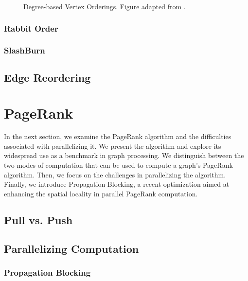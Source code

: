 \begin{figure}[!htb]
    \begin{adjustwidth}{-0.75in}{-0.75in}
        \centering
        
        \caption{
            Degree-based Vertex Orderings. Figure adapted from \cite{lwr}.
        }
        \label{fig:degree_based_vertex_orderings}   %
    \end{adjustwidth}
\end{figure}


\subsubsection{Rabbit Order}
\subsubsection{SlashBurn}
\subsection{Edge Reordering}

\section{PageRank}

In the next section, we examine the PageRank algorithm and the difficulties associated with parallelizing it. We present the algorithm and explore its widespread use as a benchmark in graph processing. We distinguish between the two modes of computation that can be used to compute a graph's PageRank algorithm. Then, we focus on the challenges in parallelizing the algorithm. Finally, we introduce Propagation Blocking, a recent optimization aimed at enhancing the spatial locality in parallel PageRank computation.
\subsection{Pull vs. Push}
\subsection{Parallelizing Computation}
\par{
}
\subsubsection{Propagation Blocking}
